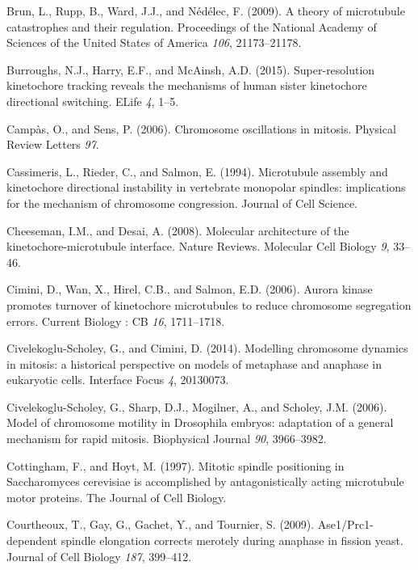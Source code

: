 \documentclass[12pt,a4paper,twoside,openright]{book}
\begin{document}
\hypertarget{ref-Brun2009}{}
Brun, L., Rupp, B., Ward, J.J., and Nédélec, F. (2009). A theory of
microtubule catastrophes and their regulation. Proceedings of the
National Academy of Sciences of the United States of America \emph{106},
21173--21178.

\hypertarget{ref-Burroughs2015}{}
Burroughs, N.J., Harry, E.F., and McAinsh, A.D. (2015). Super-resolution
kinetochore tracking reveals the mechanisms of human sister kinetochore
directional switching. ELife \emph{4}, 1--5.

\hypertarget{ref-Campas2006}{}
Campàs, O., and Sens, P. (2006). Chromosome oscillations in mitosis.
Physical Review Letters \emph{97}.

\hypertarget{ref-Cassimeris1994}{}
Cassimeris, L., Rieder, C., and Salmon, E. (1994). Microtubule assembly
and kinetochore directional instability in vertebrate monopolar
spindles: implications for the mechanism of chromosome congression.
Journal of Cell Science.

\hypertarget{ref-Cheeseman2008}{}
Cheeseman, I.M., and Desai, A. (2008). Molecular architecture of the
kinetochore-microtubule interface. Nature Reviews. Molecular Cell
Biology \emph{9}, 33--46.

\hypertarget{ref-Cimini2006}{}
Cimini, D., Wan, X., Hirel, C.B., and Salmon, E.D. (2006). Aurora kinase
promotes turnover of kinetochore microtubules to reduce chromosome
segregation errors. Current Biology : CB \emph{16}, 1711--1718.

\hypertarget{ref-Civelekoglu-Scholey2014}{}
Civelekoglu-Scholey, G., and Cimini, D. (2014). Modelling chromosome
dynamics in mitosis: a historical perspective on models of metaphase and
anaphase in eukaryotic cells. Interface Focus \emph{4}, 20130073.

\hypertarget{ref-Civelekoglu-Scholey2006}{}
Civelekoglu-Scholey, G., Sharp, D.J., Mogilner, A., and Scholey, J.M.
(2006). Model of chromosome motility in Drosophila embryos: adaptation
of a general mechanism for rapid mitosis. Biophysical Journal \emph{90},
3966--3982.

\hypertarget{ref-Cottingham1997}{}
Cottingham, F., and Hoyt, M. (1997). Mitotic spindle positioning in
Saccharomyces cerevisiae is accomplished by antagonistically acting
microtubule motor proteins. The Journal of Cell Biology.

\hypertarget{ref-Courtheoux2009}{}
Courtheoux, T., Gay, G., Gachet, Y., and Tournier, S. (2009).
Ase1/Prc1-dependent spindle elongation corrects merotely during anaphase
in fission yeast. Journal of Cell Biology \emph{187}, 399--412.
\end{document}

